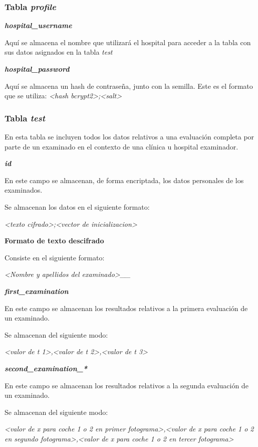\documentclass[12pt,a4paper,twoside,openright]{book}
\begin{document}
\subsubsection{Tabla \textit{profile}}

\textbf{\textit{hospital\_username}}

Aquí se almacena el nombre que utilizará el hospital para acceder a la tabla con sus datos asignados en la tabla \textit{test}

\textbf{\textit{hospital\_password}}

Aquí se almacena un hash de contraseña, junto con la semilla. Este es el formato que se utiliza: \textit{<hash bcrypt2>;<salt>}

\subsubsection{Tabla \textit{test}}

En esta tabla se incluyen todos los datos relativos a una evaluación completa por parte de un examinado en el contexto de una clínica u hospital examinador.

\textbf{\textit{id}}

En este campo se almacenan, de forma encriptada, los datos personales de los examinados.

Se almacenan los datos en el siguiente formato:

\textit{<texto cifrado>;<vector de inicializacion>}

\textbf{Formato de texto descifrado}

Consiste en el siguiente formato:

\textit{<Nombre y apellidos del examinado>\_<Número de identificación>\_<Frase generada al azar con un número indeterminado de caracteres>}

\textbf{\textit{first\_examination}}

En este campo se almacenan los resultados relativos a la primera evaluación de un examinado.

Se almacenan del siguiente modo:

\textit{<valor de t 1>,<valor de t 2>,<valor de t 3>}

\textbf{\textit{second\_examination\_*}}

En este campo se almacenan los resultados relativos a la segunda evaluación de un examinado.

Se almacenan del siguiente modo:

\textit{<valor de x para coche 1 o 2 en primer fotograma>,<valor de x para coche 1 o 2 en segundo fotograma>,<valor de x para coche 1 o 2 en tercer fotograma>}
\end{document}
